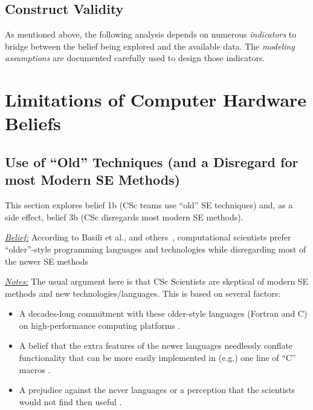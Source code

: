 \documentclass[conference,10pt]{IEEEtran}
\begin{document}
\subsection{Construct Validity}
As mentioned above, the following analysis depends on numerous {\em indicators} to bridge between the belief being explored and the available data. 
The {\em modeling assumptions} are documented carefully  used to design those indicators.

\section{Limitations of Computer Hardware Beliefs}


\subsection{Use of ``Old'' Techniques (and a Disregard for  most Modern SE Methods)}\label{lang}
This section explores belief 1b (CSc teams use ``old'' SE techniques)
and, as a side effect, belief 3b (CSc disregards most modern SE methods).

\noindent \textit{\underline{Belief:}} According to Basili et al., and others~\cite{basili08_hpc, carver07_environment, Prabhu11_cssurvey, kendall05_C, ragan14_pythoncs},
computational scientists prefer
``older''-style programming languages and technologies while disregarding most of the newer SE methods

\noindent \textit{\underline{Notes:}} The usual argument here is that CSc Scientists are skeptical of modern SE methods and new technologies/languages.
This is based on several factors: 
\begin{itemize}
  \item A decades-long commitment with these older-style languages (Fortran and C) on high-performance computing platforms \cite{faulk09_secs}.
  \item A belief that the extra features of the newer languages needlessly conflate functionality that can be more easily implemented in (e.g.) one line of ``C'' macros \cite{sanders08_risk}. 
  \item A prejudice against the never languages or a perception that the scientists would not find then useful \cite{Prabhu11_cssurvey}. 
\end{itemize}
\end{document}
